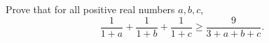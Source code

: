 Prove that for all positive real numbers $a,b,c$,
\[\dfrac{1}{1+a}+\dfrac{1}{1+b}+\dfrac{1}{1+c}\ge\dfrac{9}{3+a+b+c}.\]

